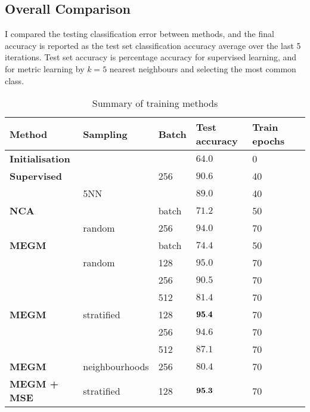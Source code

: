 \subsection{Overall Comparison}

I compared the testing classification error between methods, and the final accuracy
is reported as the test set classification accuracy average over the last 5 iterations.
Test set accuracy is percentage accuracy for supervised learning, and for metric
learning by $k = 5$ nearest neighbours and selecting the most common class.




\begin{table*}[ht]

\centering
  \caption{Summary of training methods}

  \begin{tabular}{  l l  l  l l l }
  
    \toprule
    Method &  Sampling & Batch  & Test accuracy &  Train epochs \\  \hline
    \bf{Initialisation} & &  &  $ 64.0  $ & 0  &  \\  
    \hline
    
    \bf{Supervised} & & 256 &  $ 90.6  $ & 40  &  \\  
     & 5NN  &  &  $ 89.0  $ & 40 &  \\  
     \hline
    
    \bf{NCA} &  & batch &  $  71.2  $ &  50  & \\
     & random & 256 & $  94.0  $ & 70 & \\
    
    \hline
    
    \bf{MEGM} &  & batch  &  $  74.4  $ &  50  & \\
     & random & 128 &  $  95.0  $ &  70  & \\     
     &  & 256 & $  90.5  $ &  70 & \\  
     &  & 512 & $  81.4  $ &  70 & \\
    
    \hline
    \bf{MEGM} & stratified & 128 & $  {\bf 95.4 }  $ & 70 & \\  
    
     &  & 256 & $  94.6  $ & 70 & \\  
     &  & 512 & $  87.1  $ & 70 & \\  

     \hline
     
    \bf{MEGM} & neighbourhoods & 256 & $  80.4  $ & 70  & \\
    
    \hline
    
    \bf{MEGM + MSE} & stratified & 128 & $  {\bf 95.3 }  $ & 70  & \\

      \bottomrule
    
    \end{tabular}
\label{fig:metric_summary}
\end{table*}



